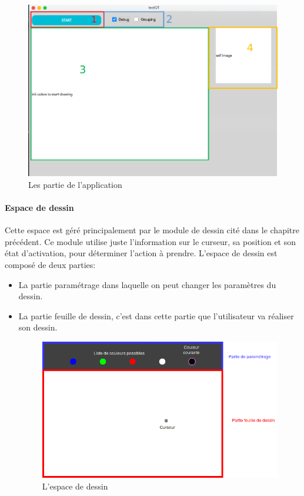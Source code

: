 \documentclass[12pt]{report}
\begin{document}
		\begin{figure}[H]
		\centering
		\includegraphics[scale=0.6]{imgs/main.png}
		\caption{Les partie de l'application}
		\label{fig:AppParts}
	\end{figure}

	\paragraph{Espace de dessin}
	Cette espace est géré principalement par le module de dessin cité dans le chapitre précédent. Ce module utilise juste l’information sur le curseur, sa position et son état d’activation, pour déterminer l’action à prendre. L’espace de dessin est composé de deux parties:
	\begin{itemize}
		\item La partie paramétrage dans laquelle on peut changer les paramètres du dessin.
		\item La partie feuille de dessin, c’est dans cette partie que l’utilisateur va réaliser son dessin.
		\begin{figure}[H]
			\centering
			\includegraphics[scale=0.75]{imgs/Drawer.png}
			\caption{L'espace de dessin}
			\label{fig:Drawer}
		\end{figure}
	\end{itemize}
	
\end{document}
